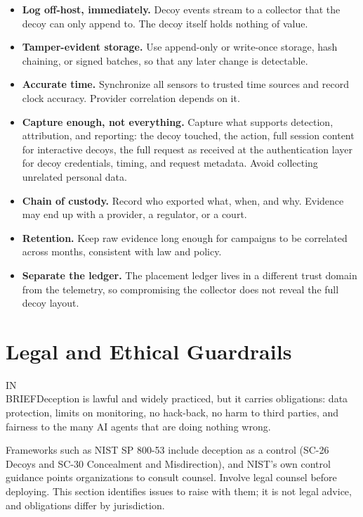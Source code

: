 \documentclass[11pt,letterpaper]{article}
\newcommand{\inbrief}[1]{\begin{inbriefbox}IN\\BRIEF\tcblower #1\end{inbriefbox}}
\begin{document}
\begin{itemize}
  \item \textbf{Log off-host, immediately.} Decoy events stream to a collector that the decoy can only append to. The decoy itself holds nothing of value.
  \item \textbf{Tamper-evident storage.} Use append-only or write-once storage, hash chaining, or signed batches, so that any later change is detectable.
  \item \textbf{Accurate time.} Synchronize all sensors to trusted time sources and record clock accuracy. Provider correlation depends on it.
  \item \textbf{Capture enough, not everything.} Capture what supports detection, attribution, and reporting: the decoy touched, the action, full session content for interactive decoys, the full request as received at the authentication layer for decoy credentials, timing, and request metadata. Avoid collecting unrelated personal data.
  \item \textbf{Chain of custody.} Record who exported what, when, and why. Evidence may end up with a provider, a regulator, or a court.
  \item \textbf{Retention.} Keep raw evidence long enough for campaigns to be correlated across months, consistent with law and policy.
  \item \textbf{Separate the ledger.} The placement ledger lives in a different trust domain from the telemetry, so compromising the collector does not reveal the full decoy layout.
\end{itemize}

\section{Legal and Ethical Guardrails}
\label{sec:legal}

\inbrief{Deception is lawful and widely practiced, but it carries obligations: data protection, limits on monitoring, no hack-back, no harm to third parties, and fairness to the many AI agents that are doing nothing wrong.}

Frameworks such as NIST SP 800-53 include deception as a control (SC-26 Decoys and SC-30 Concealment and Misdirection), and NIST's own control guidance points organizations to consult counsel. Involve legal counsel before deploying. This section identifies issues to raise with them; it is not legal advice, and obligations differ by jurisdiction.
\end{document}
